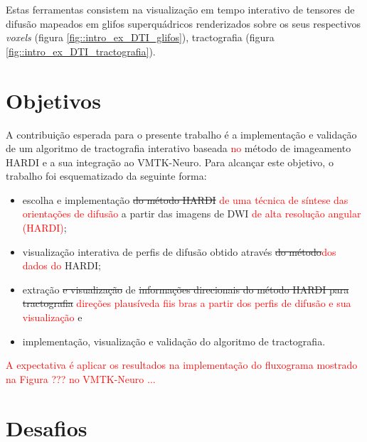 \documentclass[
    12pt,                %
    oneside,            %
    a4paper,            %
    english,            %
    french,                %
    spanish,            %
    brazil                %
    ]{abntex2}
\begin{document}
Estas ferramentas consistem na visualização em tempo interativo de tensores de difusão mapeados em glifos superquádricos renderizados sobre os seus respectivos \textit{voxels} (figura \ref{fig::intro_ex_DTI_glifos}), tractografia (figura \ref{fig::intro_ex_DTI_tractografia}).

\section{Objetivos}
\label{sec::objetivos}

A contribuição esperada para o presente trabalho é a implementação e validação de um algoritmo de tractografia interativo baseada \textcolor{red}{no} método de imageamento HARDI e a sua integração ao VMTK-Neuro. Para alcançar este objetivo, o trabalho foi esquematizado da seguinte forma:

\begin{itemize}
\item escolha e implementação \sout{do método HARDI} \textcolor{red}{de uma técnica de síntese das orientações de difusão} a partir das imagens de DWI \textcolor{red}{de alta resolução angular (HARDI)};
\item visualização interativa de perfis de difusão obtido através \sout{do método}\textcolor{red}{dos dados do} HARDI;
\item extração \sout{e visualização} de \sout{informações direcionais do método HARDI para tractografia} \textcolor{red}{direções plausíveda fiis bras a partir dos perfis de difusão e sua visualização} e
\item implementação, visualização e validação do algoritmo de tractografia.
\end{itemize}

\textcolor{red}{A expectativa é aplicar os resultados na implementação do fluxograma mostrado na Figura ??? no VMTK-Neuro ...}


\section{Desafios}
\label{sec::desafios}

\end{document}

